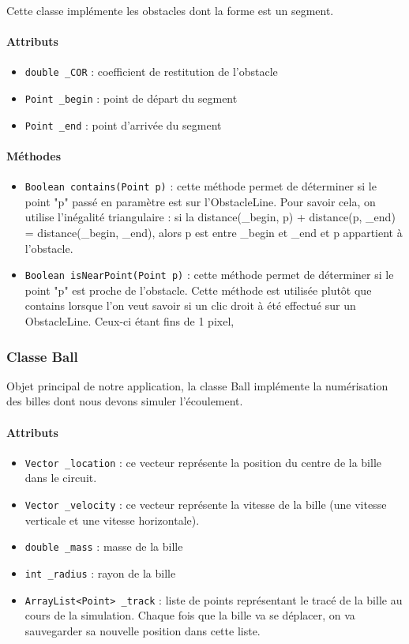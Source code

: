 \documentclass{report}
\begin{document}
Cette classe implémente les obstacles dont la forme est un segment.

\paragraph*{Attributs}
\begin{itemize}
\item \texttt{double \_COR} : coefficient de restitution de l'obstacle 
\item \texttt{Point \_begin} : point de départ du segment
\item \texttt{Point \_end} : point d'arrivée du segment
\end{itemize}

\paragraph*{Méthodes}
\begin{itemize}
\item \texttt{Boolean contains(Point p)} : cette méthode permet de déterminer si le point "p" passé en paramètre est sur l'ObstacleLine. Pour savoir cela, on utilise l'inégalité triangulaire : si la distance(\_begin, p)  + distance(p, \_end) = distance(\_begin, \_end), alors p est entre \_begin et \_end et p appartient à l'obstacle.
\item \texttt{Boolean isNearPoint(Point p)} : cette méthode permet de déterminer si le point "p" est proche de l'obstacle. Cette méthode est utilisée plutôt que contains lorsque l'on veut savoir si un clic droit à été effectué sur un ObstacleLine. Ceux-ci étant fins de 1 pixel, 
\end{itemize}

\subsubsection{Classe Ball}

Objet principal de notre application, la classe Ball implémente la numérisation des billes dont nous devons simuler l'écoulement.

\paragraph*{Attributs}
\begin{itemize}
\item \texttt{Vector \_location} : ce vecteur représente la position du centre de la bille dans le circuit. 
\item \texttt{Vector \_velocity} : ce vecteur représente la vitesse de la bille (une vitesse verticale et une vitesse horizontale).
\item \texttt{double \_mass} : masse de la bille
\item \texttt{int \_radius} : rayon de la bille
\item \texttt{ArrayList<Point> \_track} : liste de points représentant le tracé de la bille au cours de la simulation. Chaque fois que la bille va se déplacer, on va sauvegarder sa nouvelle position dans cette liste.
\end{itemize}
\end{document}
